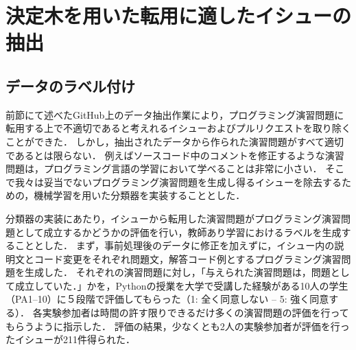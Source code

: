 \section{決定木を用いた転用に適したイシューの抽出}

\subsection{データのラベル付け}
前節にて述べたGitHub上のデータ抽出作業により，プログラミング演習問題に転用する上で不適切であると考えれるイシューおよびプルリクエストを取り除くことができた．
しかし，抽出されたデータから作られた演習問題がすべて適切であるとは限らない．
例えばソースコード中のコメントを修正するような演習問題は，プログラミング言語の学習において学べることは非常に小さい．
そこで我々は妥当でないプログラミング演習問題を生成し得るイシューを除去するための，機械学習を用いた分類器を実装することとした．


分類器の実装にあたり，イシューから転用した演習問題がプログラミング演習問題として成立するかどうかの評価を行い，教師あり学習におけるラベルを生成することとした．
まず，事前処理後のデータに修正を加えずに，イシュー内の説明文とコード変更をそれぞれ問題文，解答コード例とするプログラミング演習問題を生成した．
それぞれの演習問題に対し，「与えられた演習問題は，問題として成立していた．」かを，Pythonの授業を大学で受講した経験がある10人の学生（PA1--10）に５段階で評価してもらった（1: 全く同意しない -- 5: 強く同意する）．
各実験参加者は時間の許す限りできるだけ多くの演習問題の評価を行ってもらうように指示した．
評価の結果，少なくとも2人の実験参加者が評価を行ったイシューが211件得られた．


